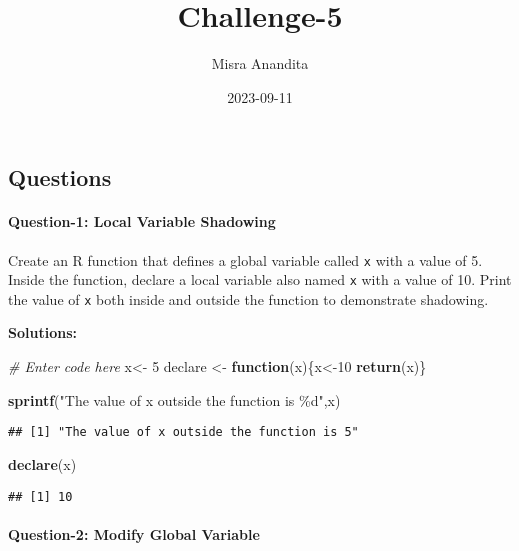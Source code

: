 \documentclass[
]{article}
\title{Challenge-5}
\author{Misra Anandita}
\date{2023-09-11}
\newenvironment{Shaded}{\begin{snugshade}}{\end{snugshade}}
\newcommand{\CommentTok}[1]{\textcolor[rgb]{0.56,0.35,0.01}{\textit{#1}}}
\newcommand{\ControlFlowTok}[1]{\textcolor[rgb]{0.13,0.29,0.53}{\textbf{#1}}}
\newcommand{\DecValTok}[1]{\textcolor[rgb]{0.00,0.00,0.81}{#1}}
\newcommand{\FunctionTok}[1]{\textcolor[rgb]{0.13,0.29,0.53}{\textbf{#1}}}
\newcommand{\NormalTok}[1]{#1}
\newcommand{\OtherTok}[1]{\textcolor[rgb]{0.56,0.35,0.01}{#1}}
\newcommand{\StringTok}[1]{\textcolor[rgb]{0.31,0.60,0.02}{#1}}
\begin{document}
\maketitle

\hypertarget{questions}{%
\subsection{Questions}\label{questions}}

\hypertarget{question-1-local-variable-shadowing}{%
\paragraph{Question-1: Local Variable
Shadowing}\label{question-1-local-variable-shadowing}}

Create an R function that defines a global variable called \texttt{x}
with a value of 5. Inside the function, declare a local variable also
named \texttt{x} with a value of 10. Print the value of \texttt{x} both
inside and outside the function to demonstrate shadowing.

\textbf{Solutions:}

\begin{Shaded}
\begin{Highlighting}[]
\CommentTok{\# Enter code here}
\NormalTok{x}\OtherTok{\textless{}{-}} \DecValTok{5} 
\NormalTok{declare }\OtherTok{\textless{}{-}} \ControlFlowTok{function}\NormalTok{(x)\{x}\OtherTok{\textless{}{-}}\DecValTok{10} 
\FunctionTok{return}\NormalTok{(x)\}}

\FunctionTok{sprintf}\NormalTok{(}\StringTok{"The value of x outside the function is \%d"}\NormalTok{,x)}
\end{Highlighting}
\end{Shaded}

\begin{verbatim}
## [1] "The value of x outside the function is 5"
\end{verbatim}

\begin{Shaded}
\begin{Highlighting}[]
\FunctionTok{declare}\NormalTok{(x)}
\end{Highlighting}
\end{Shaded}

\begin{verbatim}
## [1] 10
\end{verbatim}

\hypertarget{question-2-modify-global-variable}{%
\paragraph{Question-2: Modify Global
Variable}\label{question-2-modify-global-variable}}
\end{document}
